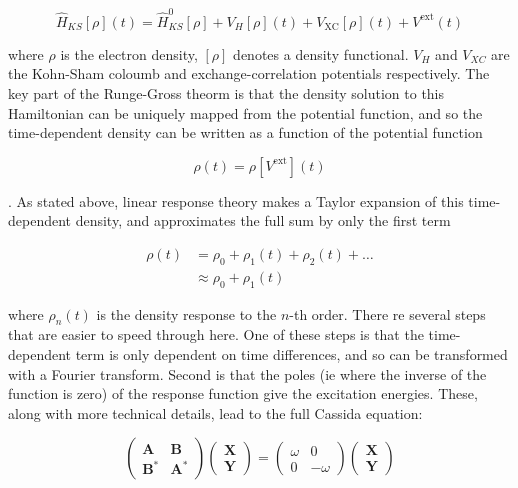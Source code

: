 \begin{equation}
\hat{H}_{KS}\left[\rho\right]\left(t\right) = \hat{H}^0_{KS}\left[\rho\right] + V_H\left[\rho\right]\left(t\right) + V_{\text{XC}}\left[\rho\right]\left(t\right) + V^{\text{ext}}\left(t\right)
\end{equation} 

where $\rho$ is the electron density, $\left[\rho\right]$ denotes a density functional. 
$V_H$ and $V_{XC}$ are the Kohn-Sham coloumb and exchange-correlation potentials 
respectively. The key part of the Runge-Gross theorm is that the density solution 
to this Hamiltonian can be uniquely mapped from the potential function, and so the 
time-dependent density can be written as a function of the potential function

\begin{equation}
\rho\left(t\right) = \rho\left[V^{\text{ext}}\right]\left(t\right)
\end{equation}

. As stated above, linear response theory makes a Taylor expansion of this time-dependent 
density, and approximates the full sum by only the first term

\begin{equation}
\begin{aligned}
\rho\left(t\right) &= \rho_0 + \rho_1\left(t\right) + \rho_2\left(t\right) + \dots \\
&\approx \rho_0 + \rho_1\left(t\right)
\end{aligned}
\end{equation}

where $\rho_n\left(t\right)$ is the density response to the $n$-th order. There 
re several steps that are easier to speed through here. One of these steps is that 
the time-dependent term is only dependent on time differences, and so can be transformed 
with a Fourier transform. Second is that the poles (ie where the inverse of the 
function is zero) of the response function give the excitation energies. These,
along with more technical details, lead to the full Cassida equation:

\begin{equation}
\label{full_cassida_eq1}
\left(\begin{matrix}
\mathbf{A} & \mathbf{B} \\
\mathbf{B^*} & \mathbf{A^*}
\end{matrix}\right)
\left(\begin{matrix}
\mathbf{X}\\
\mathbf{Y}
\end{matrix}\right)
=
\left(\begin{matrix}
\omega & 0\\
0 & -\omega
\end{matrix}\right)
\left(\begin{matrix}
\mathbf{X}\\
\mathbf{Y}
\end{matrix}\right)
\end{equation}

